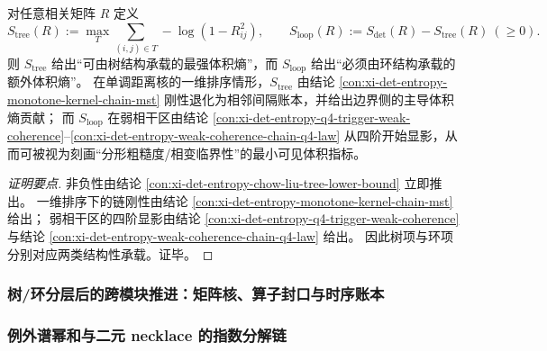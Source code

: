 \begin{conclusion}\label{con:xi-det-entropy-tree-loop-stratification}
对任意相关矩阵 \(R\) 定义
\[
S_{\mathrm{tree}}(R):=\max_{T}\sum_{(i,j)\in T}-\log(1-R_{ij}^2),
\qquad
S_{\mathrm{loop}}(R):=S_{\det}(R)-S_{\mathrm{tree}}(R)\ (\ge0).
\]
则 \(S_{\mathrm{tree}}\) 给出“可由树结构承载的最强体积熵”，而 \(S_{\mathrm{loop}}\) 给出“必须由环结构承载的额外体积熵”。
在单调距离核的一维排序情形，\(S_{\mathrm{tree}}\) 由结论 \ref{con:xi-det-entropy-monotone-kernel-chain-mst} 刚性退化为相邻间隔账本，并给出边界侧的主导体积熵贡献；
而 \(S_{\mathrm{loop}}\) 在弱相干区由结论 \ref{con:xi-det-entropy-q4-trigger-weak-coherence}--\ref{con:xi-det-entropy-weak-coherence-chain-q4-law} 从四阶开始显影，从而可被视为刻画“分形粗糙度/相变临界性”的最小可见体积指标。
\end{conclusion}
\begin{proof}[证明要点]
非负性由结论 \ref{con:xi-det-entropy-chow-liu-tree-lower-bound} 立即推出。
一维排序下的链刚性由结论 \ref{con:xi-det-entropy-monotone-kernel-chain-mst} 给出；
弱相干区的四阶显影由结论 \ref{con:xi-det-entropy-q4-trigger-weak-coherence} 与结论 \ref{con:xi-det-entropy-weak-coherence-chain-q4-law} 给出。
因此树项与环项分别对应两类结构性承载。证毕。
\end{proof}

\subsubsection{树/环分层后的跨模块推进：矩阵核、算子封口与时序账本}\label{subsubsec:xi-det-entropy-cross-module-propagation}









\subsubsection{例外谱幂和与二元 necklace 的指数分解链}\label{subsubsec:xi-exceptional-spectrum-necklace-chain}






